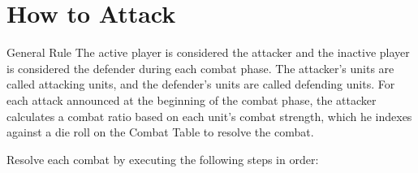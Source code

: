 \section{How to Attack}

\begin{rulebox}{General Rule}
The active player is considered the attacker and the inactive player is considered the defender during each combat phase. The attacker's units are called attacking units, and the defender's units are called defending units. For each attack announced at the beginning of the combat phase, the attacker calculates a combat ratio based on each unit's combat strength, which he indexes against a die roll on the Combat Table to resolve the combat.
\end{rulebox}


Resolve each combat by executing the following steps in order:

